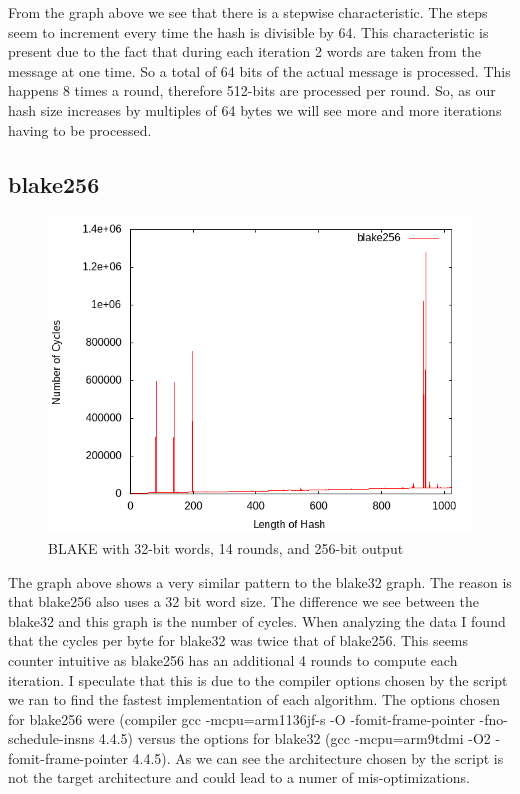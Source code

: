 \documentclass[10pt,a4paper]{article}
\begin{document}
From the graph above we see that there is a stepwise characteristic. The steps seem to increment every time the hash is divisible by 64. 
This characteristic is present due to the fact that during each iteration 2 words are taken from the message at one time. So a total of 64 bits
of the actual message is processed. This happens 8 times a round, therefore 512-bits are processed per round. So, as our hash size increases by 
multiples of 64 bytes we will see more and more iterations having to be processed.

\subsection{blake256}
    \begin{figure}[H]
        \begin{center}
            \includegraphics[scale=0.5]{images/blake256.png} 
            \caption{BLAKE with 32-bit words, 14 rounds, and 256-bit output}
        \end{center}
    \end{figure}

The graph above shows a very similar pattern to the blake32 graph. The reason is that blake256 also uses a 32 bit word size. The difference we
see between the blake32 and this graph is the number of cycles. When analyzing the data I found that the cycles per byte for blake32 was twice
that of blake256. This seems counter intuitive as blake256 has an additional 4 rounds to compute each iteration. I speculate that this is
due to the compiler options chosen by the script we ran to find the fastest implementation of each algorithm. The options chosen for blake256 were 
(compiler gcc -mcpu=arm1136jf-s -O -fomit-frame-pointer -fno-schedule-insns 4.4.5) versus the options for blake32 
(gcc -mcpu=arm9tdmi -O2 -fomit-frame-pointer 4.4.5). As we can see the architecture chosen by the script is not the target architecture and could
lead to a numer of mis-optimizations. 
\end{document}
